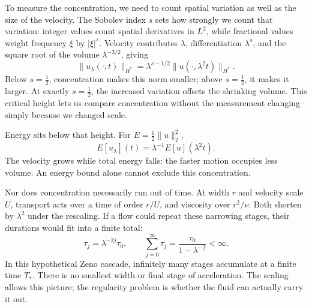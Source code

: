 To measure the concentration, we need to count spatial variation as well
as the size of the velocity. The Sobolev index \(s\) sets how strongly
we count that variation: integer values count spatial derivatives in
\(L^2\), while fractional values weight frequency \(\xi\) by
\(|\xi|^s\). Velocity contributes \(\lambda\), differentiation
\(\lambda^s\), and the square root of the volume \(\lambda^{-3/2}\), giving
\[
 \|u_\lambda(\cdot,t)\|_{\dot H^s}
 =\lambda^{s-1/2}\|u(\cdot,\lambda^2t)\|_{\dot H^s}.
\]
Below \(s=\tfrac12\), concentration makes this norm smaller; above
\(s=\tfrac12\), it makes it larger. At exactly \(s=\tfrac12\), the
increased variation offsets the shrinking volume. This critical height
lets us compare concentration without the measurement changing simply
because we changed scale.

Energy sits below that height. For \(E=\tfrac12\|u\|_2^2\),
\[
 E[u_\lambda](t)=\lambda^{-1}E[u](\lambda^2t).
\]
The velocity grows while total energy falls: the faster motion occupies
less volume. An energy bound alone cannot exclude this concentration.

Nor does concentration necessarily run out of time. At width \(r\) and
velocity scale \(U\), transport acts over a time of order \(r/U\), and
viscosity over \(r^2/\nu\). Both shorten by \(\lambda^2\) under the
rescaling. If a flow could repeat these narrowing stages, their durations
would fit into a finite total:
\[
 \tau_j=\lambda^{-2j}\tau_0,
 \qquad
 \sum_{j=0}^{\infty}\tau_j
 =\frac{\tau_0}{1-\lambda^{-2}}<\infty.
\]
In this hypothetical Zeno cascade, infinitely many stages accumulate at
a finite time \(T_*\). There is no smallest width or final stage of
acceleration. The scaling allows this picture; the regularity problem
is whether the fluid can actually carry it out.

